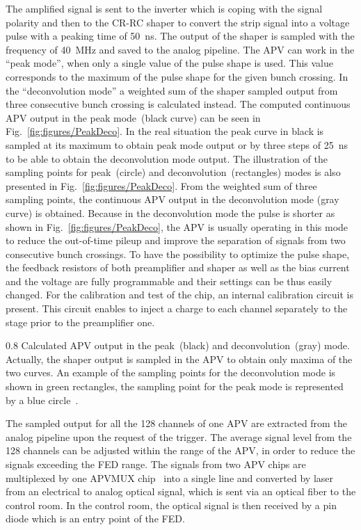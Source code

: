 The amplified signal is sent to the inverter which is coping with the signal polarity and then to the CR-RC shaper to convert the strip signal into a voltage pulse with a peaking time of 50~ns. The output of the shaper is sampled with the frequency of 40~MHz and saved to the analog pipeline. The APV can work in the ``peak mode'', when only a single value of the pulse shape is used. This value corresponds to the maximum of the pulse shape for the given bunch crossing. In the ``deconvolution mode'' a weighted sum of the shaper sampled output from three consecutive bunch crossing is calculated instead. The computed continuous APV output in the peak mode~(black curve) can be seen in Fig.~\ref{fig:figures/PeakDeco}. In the real situation the peak curve in black is sampled at its maximum to obtain peak mode output or by three steps of 25~ns to be able to obtain the deconvolution mode output. The illustration of the sampling points for peak~(circle) and deconvolution~(rectangles) modes is also presented in Fig.~\ref{fig:figures/PeakDeco}. From the weighted sum of three sampling points, the continuous APV output in the deconvolution mode (gray curve) is obtained. Because in the deconvolution mode the pulse is shorter as shown in Fig.~\ref{fig:figures/PeakDeco}, the APV is usually operating in this mode to reduce the out-of-time pileup and improve the separation of signals from two consecutive bunch crossings. To have the possibility to optimize the pulse shape, the feedback resistors of both preamplifier and shaper as well as the bias current and the voltage are fully programmable and their settings can be thus easily changed. For the calibration and test of the chip, an internal calibration circuit is present. This circuit enables to inject a charge to each channel separately to the stage prior to the preamplifier one.


                 {0.8}       %
                 {Calculated APV output in the peak~(black) and deconvolution~(gray) mode. Actually, the shaper output is sampled in the APV to obtain only maxima of the two curves. An example of the sampling points for the deconvolution mode is shown in green rectangles, the sampling point for the peak mode is represented by a blue circle~\cite{Friedl:2001kra}.} %


The sampled output for all the 128 channels of one APV are extracted from the analog pipeline upon the request of the trigger. The average signal level from the 128 channels can be adjusted within the range of the APV, in order to reduce the signals exceeding the FED range. The signals from two APV chips are multiplexed by one APVMUX chip~\cite{Ball:2007zza} into a single line and converted by laser from an electrical to analog optical signal, which is sent via an optical fiber to the control room. In the control room, the optical signal is then received by a pin diode which is an entry point of the FED.

